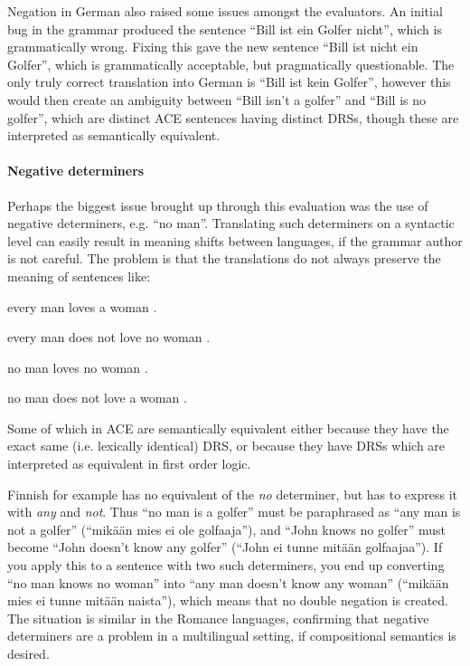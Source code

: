 \documentclass[a4paper]{article}
\begin{document}
Negation in German also raised some issues amongst the evaluators.  An
initial bug in the grammar produced the sentence ``Bill ist ein Golfer
nicht'', which is grammatically wrong.  Fixing this gave the new
sentence ``Bill ist nicht ein Golfer'', which is grammatically
acceptable, but pragmatically questionable.  The only truly correct
translation into German is ``Bill ist kein Golfer'', however this
would then create an ambiguity between ``Bill isn't a golfer'' and
``Bill is no golfer'',
which are distinct ACE sentences having distinct DRSs,
though these are interpreted as semantically equivalent.


\paragraph{Negative determiners}

Perhaps the biggest issue brought up through this evaluation was the
use of negative determiners, e.g. ``no man''.  Translating such
determiners on a syntactic level can easily result in meaning shifts
between languages, if the grammar author is not careful. The problem
is that the translations do not always preserve the meaning of
sentences like:
\begin{itemize*}
  \item every man loves a woman .
  \item every man does not love no woman .
  \item no man loves no woman .
  \item no man does not love a woman .
\end{itemize*}
Some of which in ACE are semantically equivalent either because they
have the exact same (i.e. lexically identical) DRS, or because they
have DRSs which are interpreted as equivalent in first order logic.


Finnish for example has no equivalent of the \emph{no} determiner, but
has to express it with \emph{any} and \emph{not}.  Thus ``no
man is a golfer'' must be paraphrased as ``any man is not a golfer''
(``mikään mies ei ole golfaaja''), and ``John knows no golfer'' must
become ``John doesn't know any golfer'' (``John ei tunne mitään
golfaajaa'').  If you apply this to a sentence with two such
determiners, you end up converting ``no man knows no woman'' into
``any man doesn't know any woman'' (``mikään mies ei tunne mitään
naista''), which means that no double negation is created.
The situation is similar in the Romance languages,
confirming that negative determiners are a problem in a multilingual
setting, if compositional semantics is desired.
\end{document}
